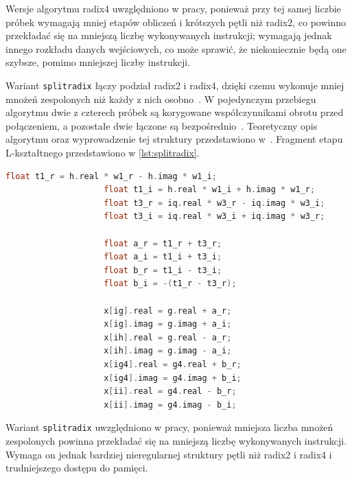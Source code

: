 Wersje algorytmu radix4 uwzględniono w pracy, ponieważ przy tej samej liczbie próbek
wymagają mniej etapów obliczeń i krótszych pętli niż radix2, co powinno
przekładać się na mniejszą liczbę wykonywanych instrukcji; wymagają jednak
innego rozkładu danych wejściowych, co może sprawić, że niekoniecznie będą one szybsze, pomimo mniejszej liczby instrukcji.

Wariant \texttt{splitradix} łączy podział radix2 i radix4, dzięki czemu
wykonuje mniej mnożeń zespolonych niż każdy z nich osobno~\cite{takahashi2019fast}. W pojedynczym przebiegu algorytmu
dwie z czterech próbek są korygowane współczynnikami obrotu przed
połączeniem, a pozostałe dwie łączone są bezpośrednio~\cite{takahashi2019fast}.
Teoretyczny opis algorytmu oraz wyprowadzenie tej struktury przedstawiono
w~\cite{takahashi2019fast}. Fragment etapu L-kształtnego przedstawiono
w \cref{lst:splitradix}.

\begin{lstlisting}[language=C,caption={Fragment etapu L-kształtnego wariantu \texttt{splitradix}},label=lst:splitradix]
                    float t1_r = h.real * w1_r - h.imag * w1_i;
                    float t1_i = h.real * w1_i + h.imag * w1_r;
                    float t3_r = iq.real * w3_r - iq.imag * w3_i;
                    float t3_i = iq.real * w3_i + iq.imag * w3_r;

                    float a_r = t1_r + t3_r;
                    float a_i = t1_i + t3_i;
                    float b_r = t1_i - t3_i;
                    float b_i = -(t1_r - t3_r);

                    x[ig].real = g.real + a_r;
                    x[ig].imag = g.imag + a_i;
                    x[ih].real = g.real - a_r;
                    x[ih].imag = g.imag - a_i;
                    x[ig4].real = g4.real + b_r;
                    x[ig4].imag = g4.imag + b_i;
                    x[ii].real = g4.real - b_r;
                    x[ii].imag = g4.imag - b_i;
\end{lstlisting}

Wariant \texttt{splitradix} uwzględniono w pracy, ponieważ mniejsza liczba
mnożeń zespolonych powinna przekładać się na mniejszą liczbę wykonywanych
instrukcji. Wymaga on jednak bardziej nieregularnej struktury pętli niż
radix2 i radix4 i trudniejszego dostępu do pamięci.

